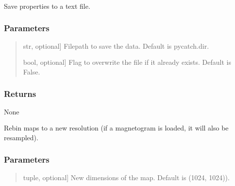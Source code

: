 \documentclass[letterpaper,10pt,english]{sphinxmanual}
\begin{document}
\begin{fulllineitems}
\begin{fulllineitems}
\label{\detokenize{pycatch/pycatch:pycatch.pycatch.pycatch.print_properties}}
\pysigstartsignatures
{}
\pysigstopsignatures
\sphinxAtStartPar
Save properties to a text file.


\subsubsection{Parameters}
\label{\detokenize{pycatch/pycatch:id23}}\begin{quote}
\begin{description}
\sphinxlineitem{file}{[}str, optional{]}
\sphinxAtStartPar
Filepath to save the data. Default is pycatch.dir.

\sphinxlineitem{overwrite}{[}bool, optional{]}
\sphinxAtStartPar
Flag to overwrite the file if it already exists. Default is False.

\end{description}
\end{quote}


\subsubsection{Returns}
\label{\detokenize{pycatch/pycatch:id24}}
\sphinxAtStartPar
None

\end{fulllineitems}


\begin{fulllineitems}
\label{\detokenize{pycatch/pycatch:pycatch.pycatch.pycatch.rebin}}
\pysigstartsignatures
{}
\pysigstopsignatures
\sphinxAtStartPar
Rebin maps to a new resolution (if a magnetogram is loaded, it will also be resampled).


\subsubsection{Parameters}
\label{\detokenize{pycatch/pycatch:id25}}\begin{quote}
\begin{description}
\sphinxlineitem{ndim}{[}tuple, optional{]}
\sphinxAtStartPar
New dimensions of the map. Default is (1024, 1024)).


\end{description}
\end{quote}
\end{fulllineitems}
\end{fulllineitems}
\end{document}
